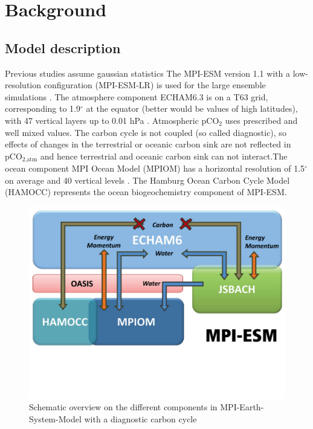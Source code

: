 \chapter{Background}\label{ch:background}



\section{Model description}
Previous studies assume gaussian statistics \citep{Thompson2015} \citep{Deser2012} 
The MPI-ESM version 1.1 with a low-resolution configuration (MPI-ESM-LR) is used for the large ensemble simulations \citep{Giorgetta2013}. The atmosphere component ECHAM6.3 is on a T63 grid, corresponding to 1.9$^\circ$ at the equator (better would be values of high latitudes), with 47 vertical layers up to 0.01 hPa \citep{Stevens2013}. 
Atmospheric pCO$_2$ uses prescribed and well mixed values. The carbon cycle is not coupled (so called diagnostic), so effects of changes in the terrestrial or oceanic carbon sink are not reflected in pCO$_{\text{2,atm}}$ and hence terrestrial and oceanic carbon sink can not interact.The ocean component MPI Ocean Model (MPIOM) has a horizontal resolution of 1.5$^\circ$ on average and 40 vertical levels \citep{Jungclaus2013}. The Hamburg Ocean Carbon Cycle Model (HAMOCC) \citep{Ilyina2013} represents the ocean biogeochemistry component of MPI-ESM. 

\begin{figure}[h]
	\centering 
	\includegraphics[scale=.42,trim=0cm 6cm 0cm 0cm,clip]{gfx/MPIESM.pdf}
	\caption{Schematic overview on the different components in MPI-Earth-System-Model with a diagnostic carbon cycle \citep{Giorgetta2013}}
	\label{fig:MPIESM}
\end{figure}

